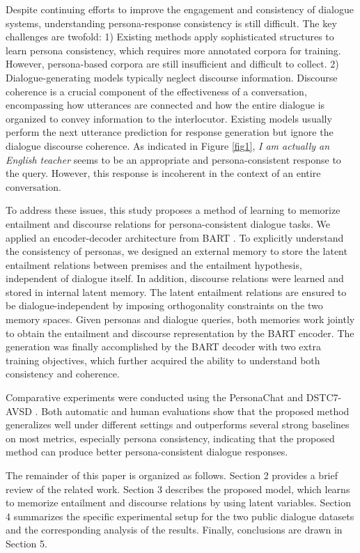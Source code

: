 \documentclass[letterpaper]{article} \usepackage{aaai23}  \usepackage{times}  \usepackage{helvet}  \usepackage{courier}  \usepackage[hyphens]{url}  \usepackage{graphicx} \urlstyle{rm} \def\UrlFont{\rm}  \usepackage{natbib}  \usepackage{caption} \frenchspacing  \setlength{\pdfpagewidth}{8.5in}  \setlength{\pdfpageheight}{11in}  \usepackage{algorithm}
\begin{document}
Despite continuing efforts to improve the engagement and consistency of dialogue systems, understanding persona-response consistency is still difficult. The key challenges are twofold: 1) Existing methods apply sophisticated structures to learn persona consistency, which requires more annotated corpora for training. However, persona-based corpora are still insufficient and difficult to collect. 2) Dialogue-generating models typically neglect discourse information. Discourse coherence is a crucial component of the effectiveness of a conversation, encompassing  how utterances are connected and how the entire dialogue is organized to convey information to the interlocutor. Existing models usually perform the next utterance prediction for response generation but ignore the dialogue discourse coherence. As indicated in Figure \ref{fig1}, \textit{I am actually an English teacher} seems to be an appropriate and persona-consistent response to the query. However, this response is incoherent in the context of an entire conversation.

To address these issues, this study proposes a method of learning to memorize entailment and discourse relations for persona-consistent dialogue tasks. We applied an encoder-decoder architecture from BART \cite{Lewis2020}. To explicitly understand the consistency of personas, we designed an external memory to store the latent entailment relations between premises and the entailment hypothesis, independent of dialogue itself. In addition, discourse relations were learned and stored in internal latent memory. The latent entailment relations are ensured to be dialogue-independent by imposing orthogonality constraints on the two memory spaces. Given personas and dialogue queries, both memories work jointly to obtain the entailment and discourse representation by the BART encoder. The generation  was finally accomplished by the BART decoder with two extra training objectives, which further acquired the ability to understand both consistency and coherence.

Comparative experiments were conducted using the PersonaChat \cite{Dinan2020} and DSTC7-AVSD \cite{Alamri2019}. Both automatic and human evaluations show that the proposed method generalizes well under different settings and outperforms several strong baselines on most metrics, especially persona consistency, indicating that the proposed method can produce better persona-consistent dialogue responses.

The remainder of this paper is organized as follows. Section 2 provides a brief review of the related work. Section 3 describes the proposed model, which learns to memorize entailment and discourse relations by using latent variables. Section 4 summarizes the specific experimental setup for the two public dialogue datasets and the corresponding analysis of the results. Finally, conclusions are drawn in Section 5.
\end{document}
